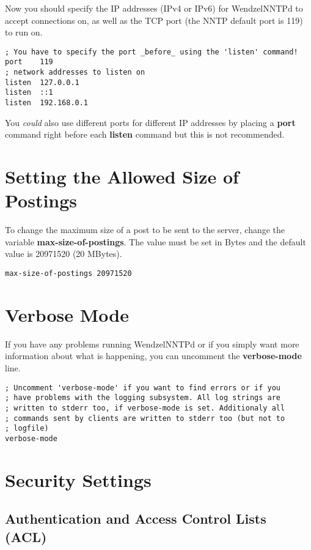 Now you should specify the IP addresses (IPv4 or IPv6) for WendzelNNTPd to accept connections on, as well as the TCP port (the NNTP default port is 119) to run on.

\begin{verbatim}
; You have to specify the port _before_ using the 'listen' command!
port	119
; network addresses to listen on
listen	127.0.0.1
listen	::1
listen	192.168.0.1
\end{verbatim}

You {\it could} also use different ports for different IP addresses by placing a {\bf port} command right before each {\bf listen} command but this is not recommended.

\section{Setting the Allowed Size of Postings}

To change the maximum size of a post to be sent to the server, change the variable {\bf max-size-of-postings}. The value must be set in Bytes and the default value is 20971520 (20 MBytes).

\begin{verbatim}
max-size-of-postings 20971520
\end{verbatim}

\section{Verbose Mode}

If you have any problems running WendzelNNTPd or if you simply want more information about what is happening, you can uncomment the {\bf verbose-mode} line.

\begin{verbatim}
; Uncomment 'verbose-mode' if you want to find errors or if you
; have problems with the logging subsystem. All log strings are
; written to stderr too, if verbose-mode is set. Additionaly all
; commands sent by clients are written to stderr too (but not to
; logfile)
verbose-mode
\end{verbatim}

\section{Security Settings}

\subsection{Authentication and Access Control Lists (ACL)}

